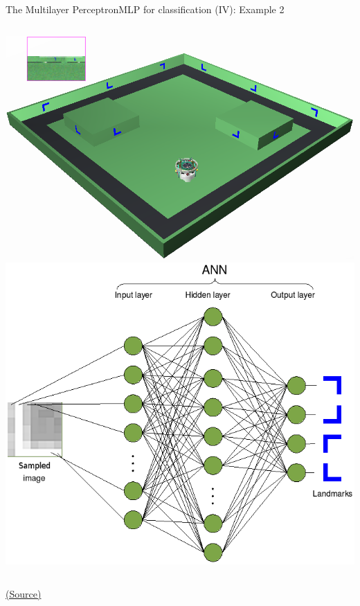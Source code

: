 \documentclass[10pt,compress]{beamer} %
\begin{document}
\begin{frame}{The Multilayer Perceptron}{MLP for classification (IV): Example 2} 
    \begin{columns}
	\centering\includegraphics[width=\linewidth]{figs/world.png}
	\centering\includegraphics[width=\linewidth]{figs/worldann.png}
    \end{columns}
    \centering \scriptsize\href{https://en.wikibooks.org/wiki/Cyberbotics\%27\_Robot\_Curriculum/}{(Source)}
\end{frame}
\end{document}
